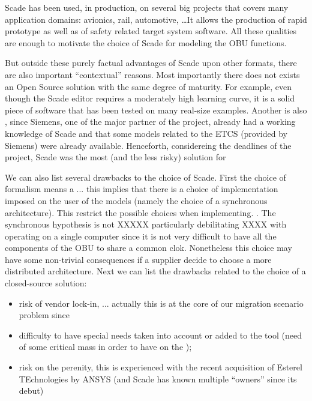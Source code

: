\documentclass{template/openetcs_report}
\begin{document}

Scade has been used, in production, on several big projects that
covers many application domains: avionics, rail, automotive, \dots It
allows the production of rapid prototype as well as of safety related
target system software. All these qualities are enough to motivate the
choice of Scade for modeling the OBU functions. 

But outside these purely factual advantages of Scade upon other
formats, there are also important ``contextual'' reasons. Most
importantly there does not exists an Open Source solution with the
same degree of maturity. For example, even though the Scade editor
requires a moderately high learning curve, it is a solid piece of
software that has been tested on many real-size examples. Another is
also , since Siemens, one of the major partner of the project, already
had a working knowledge of Scade and that some models related to the
ETCS (provided by Siemens) were already available. Henceforth,
considereing the deadlines of the project, Scade was the most (and the
less risky) solution for


We can also list several drawbacks to the choice of Scade. First the
choice of formalism means a ... this implies that there is a choice of
implementation imposed on the user of the models (namely the choice of
a synchronous architecture). This restrict the possible choices when
implementing. . The synchronous hypothesis is not XXXXX particularly
debilitating XXXX with operating on a single computer since it is not
very difficult to have all the components of the OBU to share a common
clok. Nonetheless this choice may have some non-trivial consequences
if a supplier decide to choose a more distributed architecture. Next
we can list the drawbacks related to the choice of a closed-source
solution:
\begin{itemize}
\item risk of vendor lock-in, ... actually this is at the core of our migration scenario
  problem since
\item difficulty to have special needs taken into
  account or added to the tool (need of some critical mass in order
  to have on the ); 
\item risk on the perenity, this is experienced with the recent
  acquisition of Esterel TEchnologies by ANSYS (and Scade has known
  multiple ``owners'' since its debut)
\end{itemize}
\end{document}
